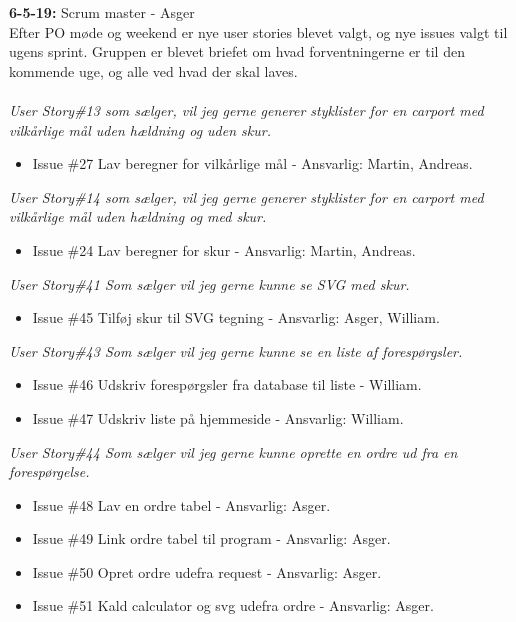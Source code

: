 \documentclass[11pt]{report}
\begin{document}
\noindent\textbf{6-5-19:} Scrum master - Asger\\
Efter PO møde og weekend er nye user stories blevet valgt, og nye issues valgt til ugens sprint. Gruppen er blevet briefet om hvad forventningerne er til den kommende uge, og alle ved hvad der skal laves.\\\\
\textit{User Story\#13 som sælger, vil jeg gerne generer styklister for en carport med vilkårlige mål uden hældning og uden skur.}
\begin{itemize}
\renewcommand\labelitemi{--}
\item Issue \#27 Lav beregner for vilkårlige mål - Ansvarlig: Martin, Andreas.
\end{itemize}
\textit{User Story\#14 som sælger, vil jeg gerne generer styklister for en carport med vilkårlige mål uden hældning og med skur.}
\begin{itemize}
\renewcommand\labelitemi{--}
\item Issue \#24 Lav beregner for skur - Ansvarlig: Martin, Andreas.
\end{itemize}
\textit{User Story\#41 Som sælger vil jeg gerne kunne se SVG med skur.}
\begin{itemize}
\renewcommand\labelitemi{--}
\item Issue \#45 Tilføj skur til SVG tegning - Ansvarlig: Asger, William.
\end{itemize}
\textit{User Story\#43 Som sælger vil jeg gerne kunne se en liste af forespørgsler.}
\begin{itemize}
\renewcommand\labelitemi{--}
\item Issue \#46 Udskriv forespørgsler fra database til liste -
  William.
\item Issue \#47 Udskriv liste på hjemmeside - Ansvarlig: William.
\end{itemize}
\textit{User Story\#44 Som sælger vil jeg gerne kunne oprette en ordre ud fra en forespørgelse.}
\begin{itemize}
\renewcommand\labelitemi{--}
\item Issue \#48  Lav en ordre tabel - Ansvarlig: Asger.
\item Issue \#49 Link ordre tabel til program - Ansvarlig: Asger.
\item Issue \#50 Opret ordre udefra request - Ansvarlig: Asger.
\item Issue \#51 Kald calculator og svg udefra ordre - Ansvarlig: Asger.
\end{itemize}
\end{document}
